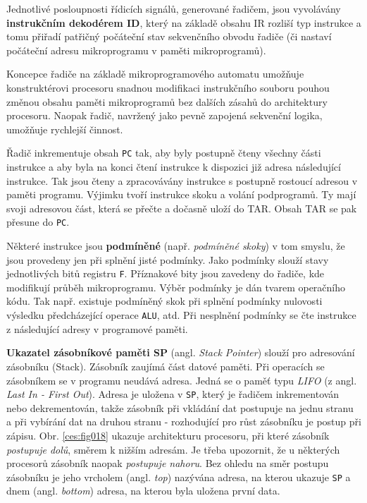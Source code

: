    Jednotlivé posloupnosti řídicích signálů, generované řadičem, jsou vyvolávány 
    \textbf{instrukčním dekodérem ID}, který na základě obsahu IR rozliší typ instrukce a tomu 
    přiřadí patřičný počáteční stav sekvenčního obvodu řadiče (či nastaví počáteční adresu 
    mikroprogramu v paměti mikroprogramů).    
    
    
    \begin{tcnote}
      Koncepce řadiče na základě mikroprogramového automatu umožňuje konstruktérovi procesoru 
      snadnou modifikaci instrukčního souboru pouhou změnou obsahu paměti mikroprogramů bez dalších 
      zásahů do architektury procesoru. Naopak řadič, navržený jako pevně zapojená sekvenční 
      logika, umožňuje rychlejší činnost.
    \end{tcnote}
    
    Řadič inkrementuje obsah \texttt{PC} tak, aby byly postupně čteny všechny části instrukce a aby 
    byla na konci čtení instrukce k dispozici již adresa následující instrukce. Tak jsou čteny a 
    zpracovávány instrukce s postupně rostoucí adresou v paměti programu. Výjimku tvoří instrukce 
    skoku a volání podprogramů. Ty mají svoji adresovou část, která se přečte a dočasně uloží do 
    TAR. Obsah TAR se pak přesune do \texttt{PC}.
    
    Některé instrukce jsou \textbf{podmíněné} (např. \emph{podmíněné skoky}) v tom smyslu, že jsou 
    provedeny jen při splnění jisté podmínky. Jako podmínky slouží stavy jednotlivých bitů registru 
    \texttt{F}. Příznakové bity jsou zavedeny do řadiče, kde modifikují průběh mikroprogramu. Výběr 
    podmínky je dán tvarem operačního kódu. Tak např. existuje podmíněný skok při splnění 
    podmínky nulovosti výsledku předcházející operace \texttt{ALU}, atd. Při nesplnění podmínky se 
    čte instrukce z následující adresy v programové paměti.
     
    \textbf{Ukazatel zásobníkové paměti SP} (angl. \emph{Stack Pointer}) slouží pro adresování 
    zásobníku (Stack). Zásobník zaujímá část datové paměti. Při operacích se zásobníkem se v 
    programu neudává adresa. Jedná se o paměť typu \emph{LIFO} (z angl. \emph{Last In - First 
    Out}). Adresa je uložena v \texttt{SP}, který je řadičem inkrementován nebo dekrementován, 
    takže zásobník při vkládání dat postupuje na jednu stranu a při vybírání dat na druhou stranu - 
    rozhodující pro růst zásobníku je postup při zápisu. Obr. \ref{ces:fig018} ukazuje 
    architekturu procesoru, při které zásobník \emph{postupuje dolů}, směrem k nižším adresám. Je 
    třeba upozornit, že u některých procesorů zásobník naopak \emph{postupuje nahoru}. Bez 
    ohledu na směr postupu zásobníku je jeho vrcholem (angl. \emph{top}) nazývána adresa, na kterou 
    ukazuje \texttt{SP} a dnem (angl. \emph{bottom}) adresa, na kterou byla uložena první data.
    
